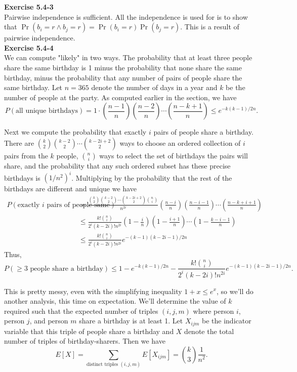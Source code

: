 \documentclass{article}
\begin{document}
\noindent\textbf{Exercise 5.4-3}\\

Pairwise independence is sufficient. All the independence is used for is to show that $\Pr(b_i=r \wedge b_j=r) = \Pr(b_i=r)\Pr(b_j=r)$. This is a result of pairwise independence.\\

\noindent\textbf{Exercise 5.4-4}\\

We can compute "likely" in two ways.  The probability that at least three people share the same birthday is 1 minus the probability that none share the same birthday, minus the probability that any number of pairs of people share the same birthday.  Let $n=365$ denote the number of days in a year and $k$ be the number of people at the party.  As computed earlier in the section, we have
\[ P(\mbox{all unique birthdays}) = 1 \cdot \left(\frac{n-1}{n}\right)\left(\frac{n-2}{n}\right)\cdots \left(\frac{n-k+1}{n}\right) \leq e^{-k(k-1)/2n}.\]

Next we compute the probability that exactly $i$ pairs of people share a birthday.  There are ${k \choose 2}{k-2 \choose 2} \cdots {k-2i+2 \choose 2}$ ways to choose an ordered collection of $i$ pairs from the $k$ people, ${n \choose i}$ ways to select the set of birthdays the pairs will share, and the probability that any such ordered subset has these precise birthdays is $(1/n^2)^i$.  Multiplying by the probability that the rest of the birthdays are different and unique we have
\begin{align*}
 P(\mbox{exactly $i$ pairs of people same}) &= \frac{{k \choose 2}{k-2 \choose 2} \cdots {k-2i+2 \choose 2}{n \choose i}}{n^{2i}} \left(\frac{n-i}{n}\right)\left(\frac{n-i-1}{n}\right) \cdots \left(\frac{n-k+i+1}{n}\right)\\
&\leq \frac{k! {n \choose i}}{2^i (k-2i)! n^{2i}}\left(1 - \frac{i}{n} \right)\left(1 - \frac{i+1}{n} \right) \cdots \left(1 - \frac{k-i-1}{n}\right) \\
&\leq \frac{k! {n \choose i}}{2^i (k-2i)! n^{2i}} e^{-(k-1)(k-2i-1)/2n}
\end{align*}
 Thus, 
\[ P(\geq 3 \mbox{ people share a birthday}) \leq 1 - e^{-k(k-1)/2n} - \frac{k! {n \choose i}}{2^i (k-2i)! n^{2i}} e^{-(k-1)(k-2i-1)/2n}.\]

This is pretty messy, even with the simplifying inequality $1+x \leq e^x$, so we'll do another analysis, this time on expectation.  We'll determine the value of $k$ required such that the expected number of triples $(i,j,m)$ where person $i$, person $j$, and person $m$ share a birthday is at least 1.  Let $X_{ijm}$ be the indicator variable that this triple of people share a birthday and $X$ denote the total number of triples of birthday-sharers.  Then we have
\[ E[X] = \sum_{\mbox{distinct triples }(i,j,m)} E[X_{ijm}] = {k \choose 3}\frac{1}{n^2}.\]
\end{document}
